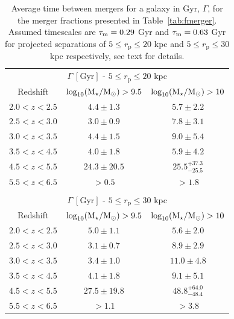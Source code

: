 \begin{table}
  \caption[Average time between mergers for a galaxy in Gyr, $\Gamma$, for the merger fractions presented in Table~\ref{tab:fmerger}.]{Average time between mergers for a galaxy in Gyr, $\Gamma$, for the merger fractions presented in Table~\ref{tab:fmerger}. Assumed timescales are $\tau_{\rm{m}} = 0.29$ Gyr and $\tau_{\rm{m}} = 0.63$ Gyr for projected separations of $5 \leq r_{\text{p}} \leq 20$ kpc and $5 \leq r_{\text{p}} \leq 30$ kpc respectively, see text for details.}
\centering
  \begin{tabular}{c|cc}
   \multicolumn{3}{c}{$\Gamma~[\text{Gyr}]$ - $5 \leq r_{\text{p}} \leq 20$ kpc} \\ \noalign{\smallskip}
   Redshift  & $\log_{10}(\text{M}_{\star} / \text{M}_{\odot}) > 9.5$ & $\log_{10}(\text{M}_{\star} / \text{M}_{\odot}) > 10$ \\
    \hline
   $2.0 < z < 2.5$ & $4.4 \pm 1.3$ & $5.7 \pm 2.2$ \\
   $2.5 < z < 3.0$ & $ 3.0 \pm 0.9$ & $7.8 \pm 3.1$\\
   $3.0 < z < 3.5$ & $ 4.4 \pm 1.5$& $ 9.0 \pm 5.4$\\
   $3.5 < z < 4.5$ & $ 4.0 \pm 1.8$& $ 5.9 \pm 4.2$\\
   $4.5 < z < 5.5$ & $ 24.3 \pm 20.5$ & $ 25.5^{+37.3}_{-25.5}$\\
   $5.5 < z < 6.5$ & $ > 0.5$& $> 1.8$ \\  
    & & \\
    
   \multicolumn{3}{c}{$\Gamma~[\text{Gyr}]$ - $5 \leq r_{\text{p}} \leq 30$ kpc} \\ \noalign{\smallskip}
   Redshift & $\log_{10}(\text{M}_{\star} / \text{M}_{\odot}) > 9.5$ & $\log_{10}(\text{M}_{\star} / \text{M}_{\odot}) > 10$ \\
    \hline
   $2.0 < z < 2.5$ & $5.0 \pm 1.1$ & $5.6 \pm 2.0$ \\
   $2.5 < z < 3.0$ & $3.1 \pm 0.7$& $8.9 \pm 2.9$\\
   $3.0 < z < 3.5$ & $3.4 \pm 1.0$& $11.0 \pm 4.8$ \\
   $3.5 < z < 4.5$ & $4.1 \pm 1.8$& $9.1 \pm 5.1$\\
   $4.5 < z < 5.5$ & $27.5 \pm 19.8$& $ 48.8^{+64.0}_{-48.4}$\\
   $5.5 < z < 6.5$ & $ > 1.1$ & $>3.8$ \\  
    
  \end{tabular}\label{tab:mergerpergal}
\end{table}


